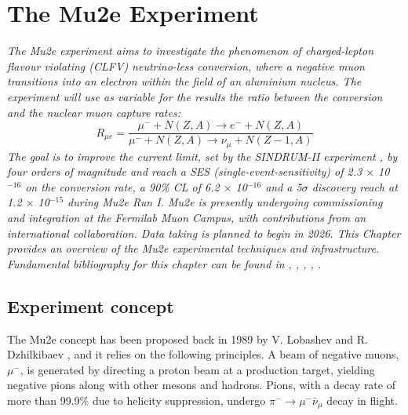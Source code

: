 \chapter{The Mu2e Experiment}\label{mu2echapter}
\textit{
The Mu2e experiment aims to investigate the phenomenon of charged-lepton flavour 
violating (CLFV) neutrino-less conversion, where a negative muon transitions into 
an electron within the field of an aluminium nucleus. The experiment will use as variable for the results 
the ratio between the conversion and the nuclear muon capture rates:
\begin{equation}\label{rmue}
R_{\mu e}=\frac{\mu^{-}+N(Z, A) \rightarrow e^{-}+N(Z, A)}{\mu^{-}+N(Z, A) \rightarrow \nu_\mu+N(Z-1, A)}
\end{equation}
The goal is to improve the current limit, set by the SINDRUM-II experiment \cite{SINDRUMII:2006dvw}, by
four orders of magnitude and reach a SES (single-event-sensitivity) of 2.3 $\times$ 
10$^{-16}$ on the
conversion rate, a 90\% CL of 6.2 $\times$ 10$^{-16}$ and a 5$\sigma$ discovery 
reach at 1.2 $\times$ 10$^{-15}$ during Mu2e Run I.
Mu2e is presently undergoing commissioning and integration at the 
Fermilab Muon Campus, 
with contributions from an international collaboration. Data taking is planned to 
begin in 2026. 
This Chapter provides an overview of the Mu2e experimental techniques and infrastructure. 
Fundamental bibliography for this chapter can be found in \cite{bartoszek2015mu2e}, 
\cite{bobbb}, \cite{Bernstein_2013}, \cite{Kargiantoulakis_2020}, \cite{universe9010054}.}

\section{Experiment concept}
The Mu2e concept has been proposed back in 1989 by V. Lobashev and R. Dzhilkibaev \cite{lobachev}, 
and it relies on the following principles. 
A beam of negative muons, $\mu ^-$, is generated by directing a proton beam at a 
production target, yielding negative pions along with other mesons and hadrons. 
Pions, with a decay rate of more than 99.9\% due to helicity suppression, undergo 
$\pi ^- \rightarrow \mu ^- \bar{\nu}_\mu$ decay in flight. 


